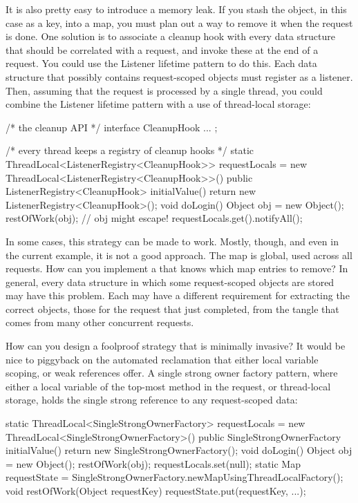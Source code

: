 It is also pretty easy to introduce a memory leak. If you
stash the object, in this case as a key, into a map, you must plan out a way to
remove it when the  request is done. One solution is to associate a
cleanup hook with every data structure that should be correlated with a request,
and invoke these at the end of a request. You could use the Listener lifetime
pattern to do this. Each data structure that possibly contains request-scoped
objects must register as a listener. Then, assuming that the request is processed
by a single thread, you could combine the Listener lifetime pattern with a use of
thread-local storage:
\begin{shortlisting}
/* the cleanup API */
interface CleanupHook { ... };

/* every thread keeps a registry of cleanup hooks */
static ThreadLocal<ListenerRegistry<CleanupHook>> requestLocals = new ThreadLocal<ListenerRegistry<CleanupHook>>() {
   public ListenerRegistry<CleanupHook> initialValue() {
      return new ListenerRegistry<CleanupHook>();
   }
}
void doLogin() {
   Object obj = new Object();
   restOfWork(obj); // obj might escape!
   requestLocals.get().notifyAll();
}
\end{shortlisting}

In some cases, this strategy can be made to work. Mostly, though, and even in the
current example, it is not a good approach. The  map is
global, used across all requests. How can you implement a  that
knows which map entries to remove? In general, every data structure in which some
request-scoped objects are stored may have this problem. Each may have a
different requirement for extracting the correct objects, those for the request
that just completed, from the tangle that comes from many other concurrent
requests.


How can you design a foolproof strategy that is minimally invasive? It would be
nice to piggyback on the automated reclamation that either local variable
scoping, or weak references offer. A single strong owner factory pattern, where
either a local variable of the top-most method in the request, or thread-local
storage, holds the single strong reference to any request-scoped data:
\begin{shortlisting}
static ThreadLocal<SingleStrongOwnerFactory> requestLocals = new ThreadLocal<SingleStrongOwnerFactory>() {
   public SingleStrongOwnerFactory initialValue() {
      return new SingleStrongOwnerFactory();
   }
}
void doLogin() {
   Object obj = new Object();
   restOfWork(obj);
   requestLocals.set(null);
}
static Map requestState = SingleStrongOwnerFactory.newMapUsingThreadLocalFactory();
void restOfWork(Object requestKey) {
   requestState.put(requestKey, ...);
}
\end{shortlisting}

